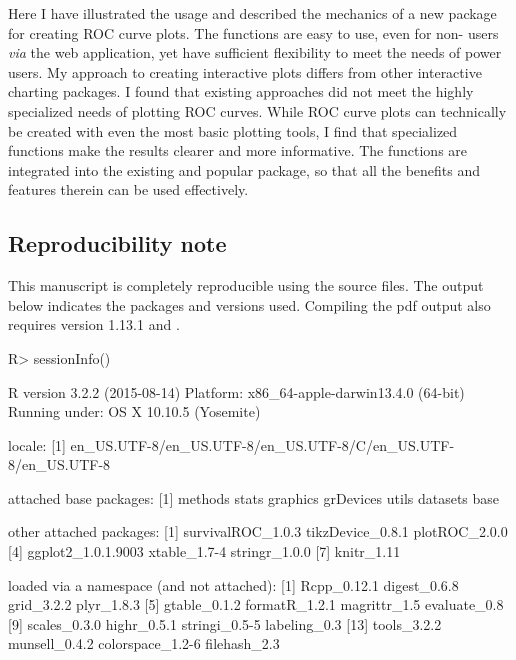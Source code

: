 \documentclass[codesnippet]{jss}
\begin{document}
Here I have illustrated the usage and described the mechanics of a new
 package for creating ROC curve plots. The functions are
easy to use, even for non- users \emph{via} the web
application, yet have sufficient flexibility to meet the needs of power
users. My approach to creating interactive plots differs from other
interactive charting packages. I found that existing approaches did not
meet the highly specialized needs of plotting ROC curves. While ROC
curve plots can technically be created with even the most basic plotting
tools, I find that specialized functions make the results clearer and
more informative. The functions are integrated into the existing and
popular  package, so that all the benefits and features
therein can be used effectively.

\subsection{Reproducibility note}\label{reproducibility-note}

This manuscript is completely reproducible using the source files. The
output below indicates the  packages and versions used.
Compiling the pdf output also requires  version 1.13.1 and
.

\begin{Schunk}
\begin{Sinput}
R> sessionInfo()
\end{Sinput}
\begin{Soutput}
R version 3.2.2 (2015-08-14)
Platform: x86_64-apple-darwin13.4.0 (64-bit)
Running under: OS X 10.10.5 (Yosemite)

locale:
[1] en_US.UTF-8/en_US.UTF-8/en_US.UTF-8/C/en_US.UTF-8/en_US.UTF-8

attached base packages:
[1] methods   stats     graphics  grDevices utils     datasets  base     

other attached packages:
[1] survivalROC_1.0.3  tikzDevice_0.8.1   plotROC_2.0.0     
[4] ggplot2_1.0.1.9003 xtable_1.7-4       stringr_1.0.0     
[7] knitr_1.11        

loaded via a namespace (and not attached):
 [1] Rcpp_0.12.1      digest_0.6.8     grid_3.2.2       plyr_1.8.3      
 [5] gtable_0.1.2     formatR_1.2.1    magrittr_1.5     evaluate_0.8    
 [9] scales_0.3.0     highr_0.5.1      stringi_0.5-5    labeling_0.3    
[13] tools_3.2.2      munsell_0.4.2    colorspace_1.2-6 filehash_2.3    
\end{Soutput}
\end{Schunk}


%

\end{document}
